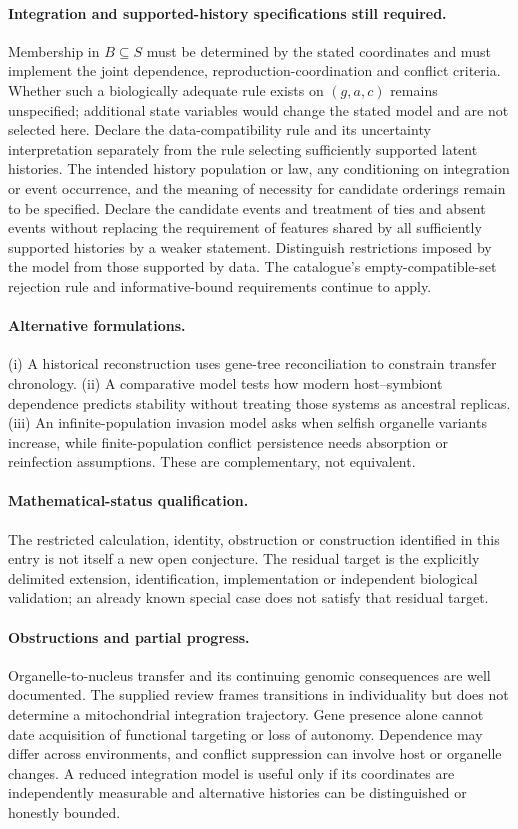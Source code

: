 \documentclass[11pt]{article}
\begin{document}
\paragraph{Integration and supported-history specifications still required.} Membership in $B\subseteq S$ must be determined by the stated coordinates and must implement the joint dependence, reproduction-coordination and conflict criteria. Whether such a biologically adequate rule exists on $(g,a,c)$ remains unspecified; additional state variables would change the stated model and are not selected here. Declare the data-compatibility rule and its uncertainty interpretation separately from the rule selecting sufficiently supported latent histories. The intended history population or law, any conditioning on integration or event occurrence, and the meaning of necessity for candidate orderings remain to be specified. Declare the candidate events and treatment of ties and absent events without replacing the requirement of features shared by all sufficiently supported histories by a weaker statement. Distinguish restrictions imposed by the model from those supported by data. The catalogue's empty-compatible-set rejection rule and informative-bound requirements continue to apply.

\paragraph{Alternative formulations.} (i) A historical reconstruction uses gene-tree reconciliation to constrain transfer chronology. (ii) A comparative model tests how modern host--symbiont dependence predicts stability without treating those systems as ancestral replicas. (iii) An infinite-population invasion model asks when selfish organelle variants increase, while finite-population conflict persistence needs absorption or reinfection assumptions. These are complementary, not equivalent.

\paragraph{Mathematical-status qualification.} The restricted calculation, identity, obstruction or construction identified in this entry is not itself a new open conjecture. The residual target is the explicitly delimited extension, identification, implementation or independent biological validation; an already known special case does not satisfy that residual target.

\paragraph{Obstructions and partial progress.} Organelle-to-nucleus transfer and its continuing genomic consequences are well documented. The supplied review frames transitions in individuality but does not determine a mitochondrial integration trajectory. Gene presence alone cannot date acquisition of functional targeting or loss of autonomy. Dependence may differ across environments, and conflict suppression can involve host or organelle changes. A reduced integration model is useful only if its coordinates are independently measurable and alternative histories can be distinguished or honestly bounded.
\end{document}
